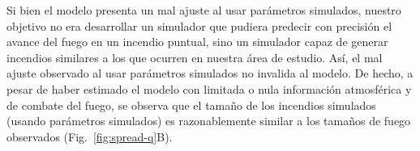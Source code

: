 \FloatBarrier

Si bien el modelo presenta un mal ajuste al usar parámetros simulados, nuestro objetivo no era desarrollar un simulador que pudiera predecir con precisión el avance del fuego en un incendio puntual, sino un simulador capaz de generar incendios similares a los que ocurren en nuestra área de estudio. Así, el mal ajuste observado al usar parámetros simulados no invalida al modelo. De hecho, a pesar de haber estimado el modelo con limitada o nula información atmosférica y de combate del fuego, se observa que el tamaño de los incendios simulados (usando parámetros simulados) es razonablemente similar a los tamaños de fuego observados (Fig.~\ref{fig:spread-q}B). 
